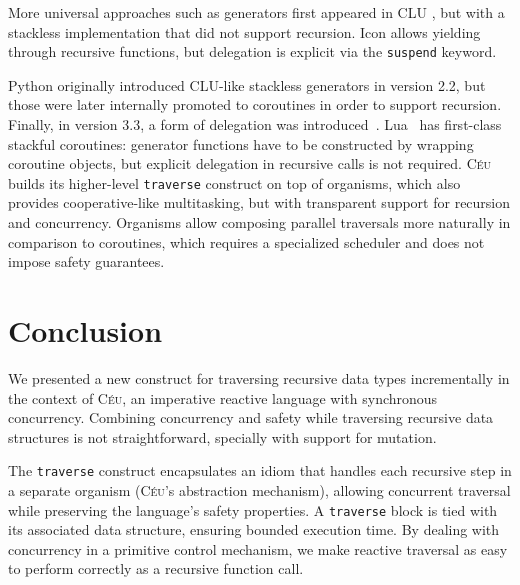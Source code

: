 \documentclass{sig-alternate}
\newcommand{\CEU}{\textsc{C\'{e}u}\xspace}
\newcommand{\code}[1] {{\small{\texttt{#1}}}}
\begin{document}

More universal approaches such as generators first appeared in CLU \cite{clu},
but with a stackless implementation that did not support recursion.
%
Icon \cite{icon} allows yielding through recursive functions, but delegation is 
explicit via the \code{suspend} keyword.
%

%
Python originally introduced CLU-like stackless generators in version 2.2,
but those were later internally promoted to coroutines in order to support
recursion. Finally, in version 3.3, a form of delegation was
introduced~\cite{peps}.
%
Lua~\cite{lua} has first-class stackful coroutines:
generator functions have to be constructed by wrapping coroutine objects, but 
explicit delegation in recursive calls is not required.
%
\CEU builds its higher-level \code{traverse} construct on top of organisms, 
which also provides cooperative-like multitasking, but with transparent support 
for recursion and concurrency.
Organisms allow composing parallel traversals more naturally in comparison to 
coroutines, which requires a specialized scheduler and does not impose safety 
guarantees.

\section{Conclusion}
\label{sec.conclusion}

We presented a new construct for traversing recursive data types
incrementally in the context of \CEU, an imperative reactive language with
synchronous concurrency.
Combining concurrency and safety while traversing recursive data structures is 
not straightforward, specially with support for mutation.

The \code{traverse} construct encapsulates an idiom that handles each recursive 
step in a separate organism (\CEU's abstraction mechanism), allowing concurrent 
traversal while preserving the language's safety properties.
A \code{traverse} block is tied with its associated data structure, ensuring 
bounded execution time. %
By dealing with concurrency in a primitive control mechanism, we make reactive 
traversal as easy to perform correctly as a recursive function call.
\end{document}
